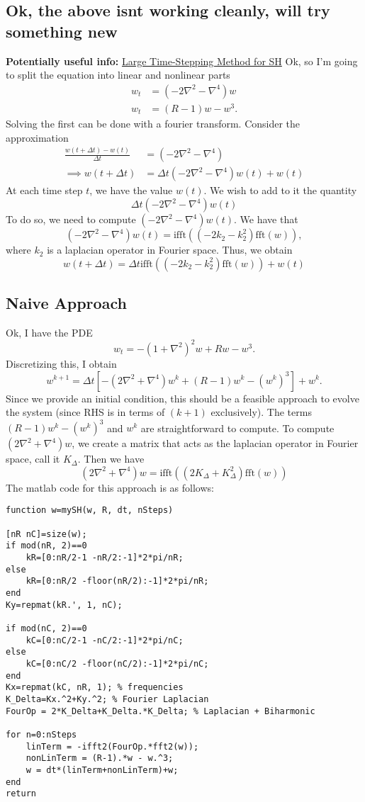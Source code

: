 \documentclass[12pt]{article}
\begin{document}
\subsection{Ok, the above isnt working cleanly, will try something new}
\textbf{Potentially useful info:} \href{https://doc.global-sci.org/uploads/Issue/AAMM/v6n8/68_992.pdf?code=hRTPxYNkNkl8Nna6NkluHg%3D%3D}{Large Time-Stepping Method for SH}
Ok, so I'm going to split the equation into linear and nonlinear parts
\begin{align*}
    w_t &= \left(-2\nabla^2-\nabla^4\right)w\\
    w_t &= (R-1)w - w^3.
\end{align*}
Solving the first can be done with a fourier transform.
Consider the approximation
\begin{align*}
    \frac{w(t+\Delta t)-w(t)}{\Delta t} &= \left( -2\nabla^2 - \nabla^4\right)\\
    \implies w(t+\Delta t) &= \Delta t \left( -2\nabla^2 - \nabla^4 \right)w(t) + w(t)
\end{align*}
At each time step $t$, we have the value $w(t)$. We wish to add to it the quantity
\[
\Delta t \left( -2\nabla^2 - \nabla^4 \right)w(t)
\] 
To do so, we need to compute $\left( -2\nabla^2 - \nabla^4 \right)w(t)$.
We have that
\[
    \left( -2\nabla^2 - \nabla^4 \right)w(t) = \text{ifft}((-2k_2-k_2^2)\text{fft}(w)),
\] 
where $k_2$ is a laplacian operator in Fourier space. Thus, we obtain
\[
 w(t+\Delta t) = \Delta t \text{ifft}((-2k_2-k_2^2)\text{fft}(w)) + w(t)
\] 
\subsection{Naive Approach}
Ok, I have the PDE
\[
w_t = -(1+\nabla^2)^2w+Rw-w^3.
\] 
Discretizing this, I obtain
\[
    w^{k+1} = \Delta t \left[ -(2\nabla^2+\nabla^4)w^k + (R-1)w^k-(w^k)^3\right]+w^k.
\] 
Since we provide an initial condition, this should be a feasible approach to evolve the system (since RHS is in terms of $(k+1)$ exclusively).
The terms $(R-1)w^k-(w^k)^3$ and $w^k$ are straightforward to compute.
To compute $(2\nabla^2+\nabla^4)w$, we create a matrix that acts as the laplacian operator in Fourier space, call it $K_{\Delta}$.
Then we have
\[
    (2\nabla^2+\nabla^4)w = \text{ifft}((2K_{\Delta}+K_{\Delta}^2)\text{fft}(w))
\]
The matlab code for this approach is as follows:
\begin{verbatim}
function w=mySH(w, R, dt, nSteps)

[nR nC]=size(w);
if mod(nR, 2)==0
    kR=[0:nR/2-1 -nR/2:-1]*2*pi/nR;
else
    kR=[0:nR/2 -floor(nR/2):-1]*2*pi/nR;
end
Ky=repmat(kR.', 1, nC);

if mod(nC, 2)==0
    kC=[0:nC/2-1 -nC/2:-1]*2*pi/nC;
else
    kC=[0:nC/2 -floor(nC/2):-1]*2*pi/nC;
end
Kx=repmat(kC, nR, 1); % frequencies
K_Delta=Kx.^2+Ky.^2; % Fourier Laplacian
FourOp = 2*K_Delta+K_Delta.*K_Delta; % Laplacian + Biharmonic

for n=0:nSteps
    linTerm = -ifft2(FourOp.*fft2(w));
    nonLinTerm = (R-1).*w - w.^3;
    w = dt*(linTerm+nonLinTerm)+w;
end
return
\end{verbatim}
\end{document}
